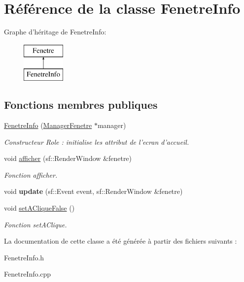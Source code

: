 \hypertarget{classFenetreInfo}{\section{\-Référence de la classe \-Fenetre\-Info}
\label{classFenetreInfo}
}
\-Graphe d'héritage de \-Fenetre\-Info\-:\begin{figure}[H]
\begin{center}
\leavevmode
\includegraphics[height=2.000000cm]{classFenetreInfo}
\end{center}
\end{figure}
\subsection*{\-Fonctions membres publiques}
\begin{DoxyCompactItemize}
\item 
\hypertarget{classFenetreInfo_aa5ad837d6d17760f287e272e3adf5278}{\hyperlink{classFenetreInfo_aa5ad837d6d17760f287e272e3adf5278}{\-Fenetre\-Info} (\hyperlink{classManagerFenetre}{\-Manager\-Fenetre} $\ast$manager)}\label{classFenetreInfo_aa5ad837d6d17760f287e272e3adf5278}

\begin{DoxyCompactList}\small\item\em \-Constructeur \-Role \-: initialise les attribut de l'ecran d'accueil. \end{DoxyCompactList}\item 
\hypertarget{classFenetreInfo_aa44271e51b95de0c49dcf05ec655927f}{void \hyperlink{classFenetreInfo_aa44271e51b95de0c49dcf05ec655927f}{afficher} (sf\-::\-Render\-Window \&fenetre)}\label{classFenetreInfo_aa44271e51b95de0c49dcf05ec655927f}

\begin{DoxyCompactList}\small\item\em \-Fonction afficher. \end{DoxyCompactList}\item 
\hypertarget{classFenetreInfo_a5113582738da07d64a85c2a10eb853f0}{void {\bfseries update} (sf\-::\-Event event, sf\-::\-Render\-Window \&fenetre)}\label{classFenetreInfo_a5113582738da07d64a85c2a10eb853f0}

\item 
\hypertarget{classFenetreInfo_a14568d1613f5d861aeefa40eab62bfcf}{void \hyperlink{classFenetreInfo_a14568d1613f5d861aeefa40eab62bfcf}{set\-A\-Clique\-False} ()}\label{classFenetreInfo_a14568d1613f5d861aeefa40eab62bfcf}

\begin{DoxyCompactList}\small\item\em \-Fonction set\-A\-Clique. \end{DoxyCompactList}\end{DoxyCompactItemize}


\-La documentation de cette classe a été générée à partir des fichiers suivants \-:\begin{DoxyCompactItemize}
\item 
\-Fenetre\-Info.\-h\item 
\-Fenetre\-Info.\-cpp\end{DoxyCompactItemize}
